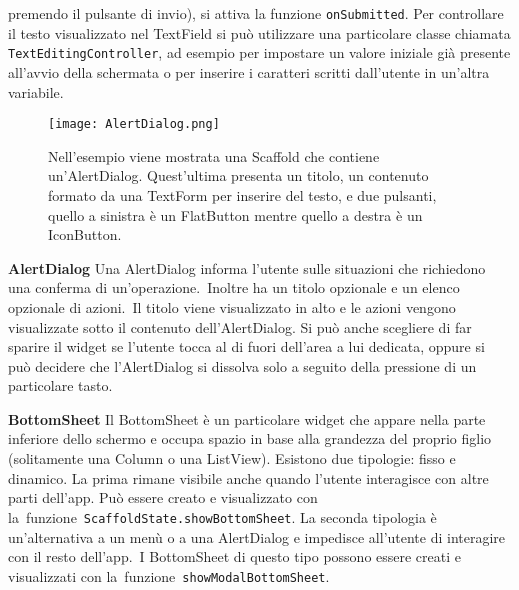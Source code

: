 \begin{trivlist}
		premendo il pulsante di invio), si attiva
		la funzione \texttt{onSubmitted}. Per controllare il testo visualizzato nel
		TextField si può utilizzare una particolare classe chiamata
		\verb|TextEditingController|, ad esempio per impostare
		un valore iniziale già presente all'avvio della schermata o per inserire
		i caratteri scritti dall'utente in un'altra variabile.
		\begin{figure}
			\centering
			\texttt{[image: AlertDialog.png]}			
			\caption{Nell'esempio viene mostrata una Scaffold che contiene
			un'AlertDialog. Quest'ultima presenta un titolo, un contenuto
			formato da una TextForm per inserire del testo, e due pulsanti,
			quello a sinistra è un FlatButton mentre quello a destra è un IconButton.}
		\end{figure}
		\item \textbf{AlertDialog} \newline
		Una AlertDialog informa l'utente sulle situazioni che richiedono una
		conferma di un'operazione. Inoltre ha un titolo opzionale e un
		elenco opzionale di azioni. Il titolo viene visualizzato in alto e le
		azioni vengono visualizzate sotto il contenuto dell’AlertDialog. Si può
		anche scegliere di far sparire il widget se l'utente tocca al di fuori dell'area a
		lui dedicata, oppure si può decidere che l'AlertDialog si
		dissolva solo a seguito della pressione di un particolare tasto.
		\item \textbf{BottomSheet} \newline
		Il BottomSheet è un particolare widget che appare nella parte inferiore
		dello schermo e occupa spazio in base alla grandezza del proprio figlio
		(solitamente una Column o una ListView). Esistono due tipologie: fisso e
		dinamico. La prima rimane visibile anche quando l'utente interagisce con
		altre parti dell'app. Può essere creato e visualizzato  con
		la funzione \texttt{ScaffoldState.showBottomSheet}. La seconda tipologia
		è un'alternativa a un menù o a una AlertDialog e impedisce all'utente di
		interagire con il resto dell'app. I BottomSheet di questo tipo possono
		essere creati e visualizzati con
		la funzione \texttt{showModalBottomSheet}.
	\end{trivlist}

